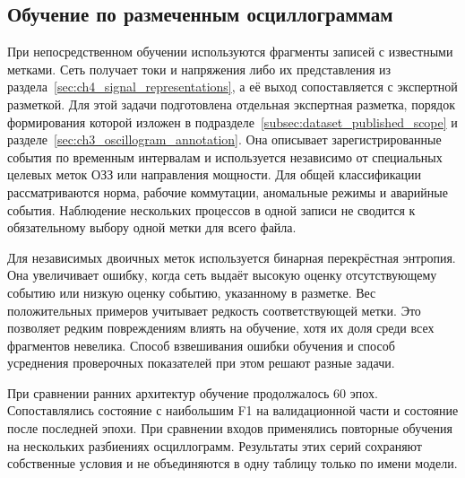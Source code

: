 \subsection{Обучение по размеченным осциллограммам}
\label{sec:ch4_supervised_training}


При непосредственном обучении используются фрагменты записей
с известными метками. Сеть получает токи и напряжения
либо их представления из раздела~\ref{sec:ch4_signal_representations},
а её выход сопоставляется с экспертной разметкой.
Для этой задачи подготовлена отдельная экспертная разметка,
порядок формирования которой изложен в
подразделе~\ref{subsec:dataset_published_scope}
и разделе~\ref{sec:ch3_oscillogram_annotation}.
Она описывает зарегистрированные события по временным
интервалам и используется независимо от специальных
целевых меток ОЗЗ или направления мощности.
Для общей классификации рассматриваются норма,
рабочие коммутации, аномальные режимы и аварийные события.
Наблюдение нескольких процессов в одной записи
не сводится к обязательному выбору одной метки для всего файла.

{}

Для независимых двоичных меток используется бинарная
перекрёстная энтропия. Она увеличивает ошибку, когда сеть
выдаёт высокую оценку отсутствующему событию или низкую
оценку событию, указанному в разметке.
Вес положительных примеров учитывает редкость соответствующей
метки. Это позволяет редким повреждениям влиять на обучение,
хотя их доля среди всех фрагментов невелика.
Способ взвешивания ошибки обучения и способ усреднения
проверочных показателей при этом решают разные задачи.

При сравнении ранних архитектур обучение продолжалось
60 эпох. Сопоставлялись состояние с наибольшим F1
на валидационной части и состояние после последней эпохи.
При сравнении входов применялись повторные
обучения на нескольких разбиениях осциллограмм.
Результаты этих серий сохраняют собственные условия
и не объединяются в одну таблицу только по имени модели.

